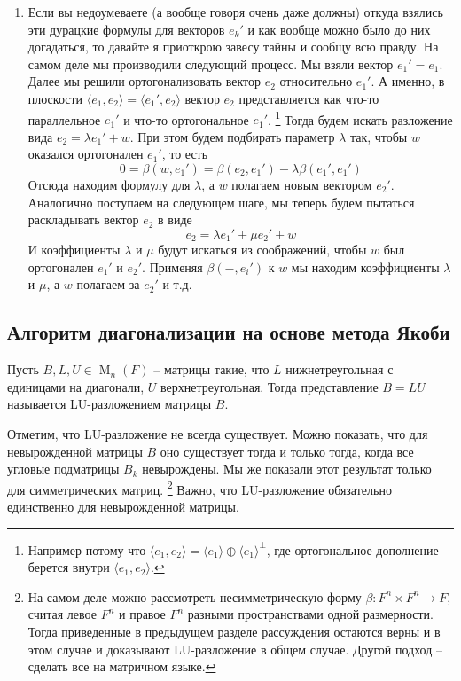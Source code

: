 \begin{enumerate}
\item Если вы недоумеваете (а вообще говоря очень даже должны) откуда взялись эти дурацкие формулы для векторов $e_k'$ и как вообще можно было до них догадаться, то давайте я приоткрою завесу тайны и сообщу всю правду.
На самом деле мы производили следующий процесс.
Мы взяли вектор $e_1' = e_1$.
Далее мы решили ортогонализовать вектор $e_2$ относительно $e_1'$.
А именно, в плоскости $\langle e_1, e_2\rangle = \langle e_1', e_2\rangle$ вектор $e_2$ представляется как что-то параллельное $e_1'$ и что-то ортогональное $e_1'$.%
\footnote{Например потому что $\langle e_1, e_2\rangle = \langle e_1\rangle \oplus \langle e_1\rangle^\bot$, где ортогональное дополнение берется внутри $\langle e_1,e_2\rangle$.}
Тогда будем искать разложение вида $e_2 = \lambda e_1' + w$.
При этом будем подбирать параметр $\lambda$ так, чтобы $w$ оказался ортогонален $e_1'$, то есть
\[
0 = \beta(w, e_1')  = \beta(e_2, e_1') - \lambda\beta( e_1',e_1')
\]
Отсюда находим формулу для $\lambda$, а $w$ полагаем новым вектором $e_2'$.
Аналогично поступаем на следующем шаге, мы теперь будем пытаться раскладывать вектор $e_2$ в виде
\[
e_2 = \lambda e_1' + \mu e_2' + w
\]
И коэффициенты $\lambda$ и $\mu$ будут искаться из соображений, чтобы $w$ был ортогонален $e_1'$ и $e_2'$.
Применяя $\beta({-}, e_i')$ к $w$ мы находим коэффициенты $\lambda$ и $\mu$, а $w$ полагаем за $e_2'$ и т.д.
\end{enumerate}

\subsection{Алгоритм диагонализации на основе метода Якоби}
\label{subsection::JacobyAlg}

\begin{definition}
Пусть $B, L, U\in\operatorname{M}_n(F)$ -- матрицы такие, что $L$ нижнетреугольная с единицами на диагонали, $U$ верхнетреугольная.
Тогда представление $B = LU$ называется LU-разложением матрицы $B$.
\end{definition}

Отметим, что LU-разложение не всегда существует.
Можно показать, что для невырожденной матрицы $B$ оно существует тогда и только тогда, когда все угловые подматрицы $B_k$ невырождены.
Мы же показали этот результат только для симметрических матриц.%
\footnote{На самом деле можно рассмотреть несимметрическую форму $\beta\colon F^n\times F^n \to F$, считая левое $F^n$ и правое $F^n$ разными пространствами одной размерности.
Тогда приведенные в предыдущем разделе рассуждения остаются верны и в этом случае и доказывают LU-разложение в общем случае.
Другой подход -- сделать все на матричном языке.}
Важно, что LU-разложение обязательно единственно для невырожденной матрицы.


